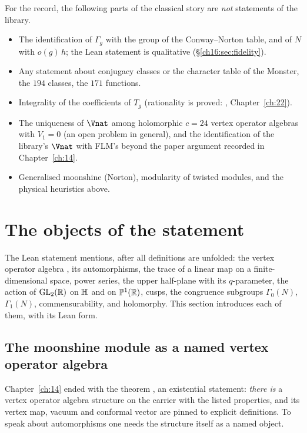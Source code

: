 For the record, the following parts of the classical story are \emph{not} statements of the library.
\begin{itemize}
\item The identification of $\Gamma_g$ with the group of the Conway--Norton table, and of $N$ with $o(g)\,h$; the Lean
  statement is qualitative (\S\ref{ch16:sec:fidelity}).
\item Any statement about conjugacy classes or the character table of the Monster, the $194$ classes, the $171$
  functions.
\item Integrality of the coefficients of $T_g$ (rationality is proved: , Chapter~\ref{ch:22}).
\item The uniqueness of $\Vnat$ among holomorphic $c=24$ vertex operator algebras with $V_1=0$ (an open problem in
  general), and the identification of the library's $\Vnat$ with FLM's beyond the paper argument recorded in
  Chapter~\ref{ch:14}.
\item Generalised moonshine (Norton), modularity of twisted modules, and the physical heuristics above.
\end{itemize}


\section{The objects of the statement}\label{ch16:sec:objects}

The Lean statement  mentions, after all definitions are unfolded: the vertex operator
algebra , its automorphisms, the trace of a linear map on a finite-dimensional space, power series, the
upper half-plane with its $q$-parameter, the action of $\mathrm{GL}_2(\mathbb{R})$ on $\mathbb{H}$ and on $\mathbb{P}^1(\mathbb{R})$,
cusps, the congruence subgroups $\Gamma_0(N)$, $\Gamma_1(N)$, commensurability, and holomorphy.  This section
introduces each of them, with its Lean form.

\subsection{The moonshine module as a named vertex operator algebra}

Chapter~\ref{ch:14} ended with the theorem , an existential statement: \emph{there is} a
vertex operator algebra structure on the carrier  with the listed properties, and its vertex map, vacuum and
conformal vector are pinned to explicit definitions.  To speak about automorphisms one needs the structure itself as a
named object.

